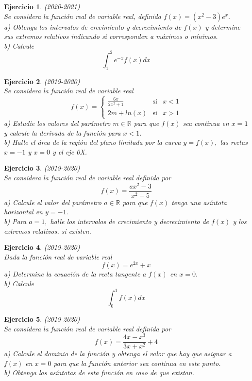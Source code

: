 \documentclass[12pt, a4paper]{amsart}
\newtheorem{ejer}{Ejercicio}
\begin{document}
\begin{ejer}\em (2020-2021)\\
Se considera la función real de variable real, definida $f(x) = (x^2 - 3)e^x.$\\
a) Obtenga los intervalos de crecimiento y decrecimiento de $f(x)$ y determine sus extremos relativos indicando si corresponden a máximos o mínimos.\\
b) Calcule 
\[\int_1^2e^{-x}f(x)dx\]
\end{ejer}

\newpage

\begin{ejer}\em (2019-2020)\\
Se considera la función real de variable real
\[
f(x)=\left \{ \begin{matrix}
\frac{6x}{2x^2+1} & \text{si} & x< 1\\
2m+ln(x) & \text{si} & x> 1
\end{matrix}\right.
\]
a) Estudie los valores del parámetro $m\in\mathbb{R}$ para que $f (x)$ sea continua en $x = 1$ y calcule la derivada de la función para $x < 1 .$\\
b) Halle el área de la región del plano limitada por la curva $y = f (x) ,$ las rectas $x= -1$ y $x = 0$ y el eje 0X.
\end{ejer}

\begin{ejer}\em (2019-2020)\\
Se considera la función real de variable real definida por
\[f(x) =\frac{ax^2-3}{x^2-5}\]
a) Calcule el valor del parámetro $a\in \mathbb{R}$ para que $f (x)$ tenga una asíntota horizontal en $y = -1 .$\\
b) Para $a = 1,$ halle los intervalos de crecimiento y decrecimiento de $f (x)$ y los extremos relativos, si existen.
\end{ejer}

\begin{ejer}\em (2019-2020)\\
Dada la función real de variable real
\[f (x) = e^{2x} + x\]
a) Determine la ecuación de la recta tangente a $f (x)$ en $x = 0.$\\
b) Calcule
\[\int_0^1 f(x)dx\]
\end{ejer}

\begin{ejer}\em (2019-2020)\\
Se considera la función real de variable real definida por
\[f(x)=\frac{4x-x^3}{3x+x^2}+4\]
a) Calcule el dominio de la función y obtenga el valor que hay que asignar a $f (x)$ en $x = 0$ para que la función anterior sea continua en este punto.\\
b) Obtenga las asíntotas de esta función en caso de que existan.
\end{ejer}
\end{document}
